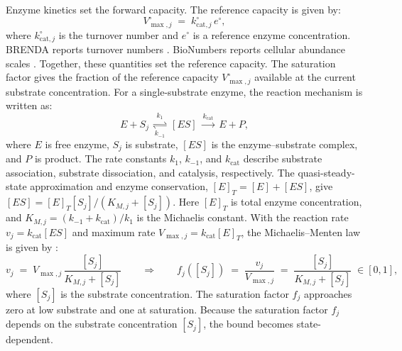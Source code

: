 Enzyme kinetics set the forward capacity. The reference capacity is given by:
\begin{equation}\label{eq:vmax}
  V^{\circ}_{\max,j} \;=\; k^{\circ}_{\mathrm{cat},j}\,e^{\circ},
\end{equation}
where $k^{\circ}_{\mathrm{cat},j}$ is the turnover number and $e^{\circ}$
is a reference enzyme concentration. BRENDA reports turnover numbers
\cite{Chang2021}. BioNumbers reports cellular abundance scales
\cite{Milo2010}. Together, these quantities set the reference capacity. The
saturation factor gives the fraction of
the reference capacity $V^{\circ}_{\max,j}$ available at the current substrate
concentration.
For a single-substrate enzyme, the reaction mechanism is written as:
\begin{equation}\label{eq:mm-mechanism}
  E + S_j \;\underset{k_{-1}}{\overset{k_1}{\rightleftharpoons}}\; [ES]
  \;\overset{k_{\mathrm{cat}}}{\longrightarrow}\; E + P,
\end{equation}
where $E$ is free enzyme, $S_j$ is substrate, $[ES]$ is the enzyme--substrate
complex, and $P$ is product. The rate constants $k_1$, $k_{-1}$, and
$k_{\mathrm{cat}}$ describe substrate association, substrate dissociation,
and catalysis, respectively. The quasi-steady-state
approximation and enzyme conservation, $[E]_T=[E]+[ES]$, give
$[ES]=[E]_T[S_j]/(K_{M,j}+[S_j])$. Here $[E]_T$ is total enzyme
concentration, and $K_{M,j}=(k_{-1}+k_{\mathrm{cat}})/k_1$ is the Michaelis
constant. With the reaction rate $v_j=k_{\mathrm{cat}}[ES]$ and maximum rate
$V_{\max,j}=k_{\mathrm{cat}}[E]_T$, the Michaelis--Menten law is given by
\cite{MichaelisMenten1913}:
\begin{equation}\label{eq:mm}
  v_j \;=\; V_{\max,j}\,\frac{[S_j]}{K_{M,j}+[S_j]}
  \qquad\Longrightarrow\qquad
  f_j([S_j]) \;=\; \frac{v_j}{V_{\max,j}}
  \;=\; \frac{[S_j]}{K_{M,j}+[S_j]}\;\in[0,1],
\end{equation}
where $[S_j]$ is the substrate concentration. The saturation factor $f_j$
approaches zero at low substrate and one at saturation. Because the saturation
factor $f_j$ depends on the substrate concentration $[S_j]$, the bound becomes
state-dependent.

